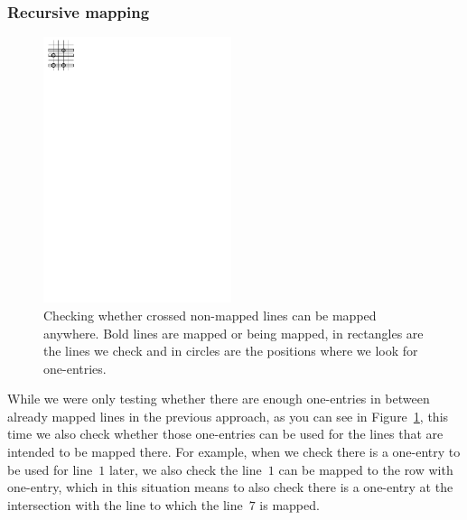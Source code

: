 \subsubsection{Recursive mapping}
\begin{figure}[h!]
\centering
\includegraphics[width=55mm]{../img/recursive.pdf}
\caption{Checking whether crossed non-mapped lines can be mapped anywhere. Bold lines are mapped or being mapped, in rectangles are the lines we check and in circles are the positions where we look for one-entries.}
\label{recursive}
\end{figure}
While we were only testing whether there are enough one-entries in between already mapped lines in the previous approach, as you can see in Figure~\ref{recursive}, this time we also check whether those one-entries can be used for the lines that are intended to be mapped there. For example, when we check there is a one-entry to be used for line~$1$ later, we also check the line~$1$ can be mapped to the row with one-entry, which in this situation means to also check there is a one-entry at the intersection with the line to which the line~$7$ is mapped.
